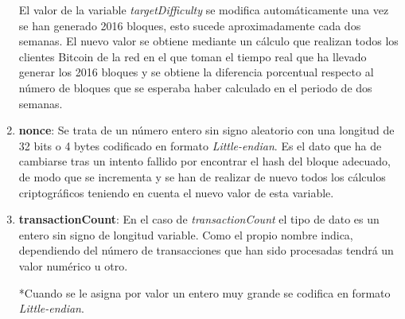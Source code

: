 \documentclass{article}
\begin{document}
\begin{enumerate}
        El valor de la variable \textit{targetDifficulty} se modifica automáticamente una vez se han generado 2016 bloques, esto sucede aproximadamente cada dos semanas. El nuevo valor se obtiene mediante un cálculo que realizan todos los clientes Bitcoin de la red en el que toman el tiempo real que ha llevado generar los 2016 bloques y se obtiene la diferencia porcentual respecto al número de bloques que se esperaba haber calculado en el periodo de dos semanas.
        
        \item \textbf{nonce}: Se trata de un número entero sin signo aleatorio con una longitud de 32 bits o 4 bytes codificado en formato \textit{Little-endian}. Es el dato que ha de cambiarse tras un intento fallido por encontrar el hash del bloque adecuado, de modo que se incrementa y se han de realizar de nuevo todos los cálculos criptográficos teniendo en cuenta el nuevo valor de esta variable.
        
        \item \textbf{transactionCount}: En el caso de \textit{transactionCount} el tipo de dato es un entero sin signo de longitud variable. Como el propio nombre indica, dependiendo del número de transacciones que han sido procesadas tendrá un valor numérico u otro.
        
        *Cuando se le asigna por valor un entero muy grande se codifica en formato \textit{Little-endian}.
    \end{enumerate}
    
\end{document}
